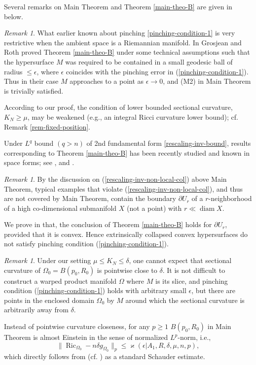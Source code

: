 \documentclass{amsart}
\numberwithin{equation}{section}
\theoremstyle{remark}
\newtheorem{rem}[theo]{Remark}
\renewcommand{\(}{\left(}
\renewcommand{\)}{\right)}
\renewcommand{\~}{\tilde}
\renewcommand{\-}{\overline}
\renewcommand{\d}{\delta}
\newcommand{\Ric}{\operatorname{Ric}}
\begin{document}
Several remarks on Main Theorem and Theorem \ref{main-theo-B} are given in below.
\begin{rem}
	What earlier known about pinching \eqref{pinching-condition-1} is very restrictive when the ambient space is a Riemannian manifold.
	In \cite{Grosjean-Roth2012} Grosjean and Roth proved Theorem \ref{main-theo-B} under some technical assumptions such that the hypersurface $M$ was required to be contained in a small geodesic ball of radius $\le \epsilon$, where $\epsilon$ coincides with the pinching error in (\ref{pinching-condition-1}). Thus in their case $M$ approaches to a point as $\epsilon\to 0$, and (M2) in Main Theorem is trivially satisfied.
	
	According to our proof, the condition of lower bounded sectional curvature, $K_N\ge \mu$, may be weakened (e.g., an integral Ricci curvature lower bound); cf. Remark \ref{rem-fixed-position}.
	
	Under $L^q$ bound $(q>n)$ of 2nd fundamental form \eqref{rescaling-inv-bound}, results corresponding to Theorem \ref{main-theo-B} has been recently studied and known in space forms; see \cite{Colbois-Grosjean2007}, \cite{Aubry-Grosjean} and \cite{Hu-Xu2017}. 
\end{rem}

\begin{rem}
	By the discussion on (\ref{rescaling-inv-non-local-col}) above Main Theorem, typical examples that violate (\ref{rescaling-inv-non-local-col}), and thus are not covered by Main Theorem, contain the boundary $\partial U_r$ of a $r$-neighborhood of a high co-dimensional submanifold $X$ (not a point) with $r \ll\operatorname{diam}X$.
	
	We prove in \cite{Hu-Xu2019} that, the conclusion of Theorem \ref{main-theo-B} holds for
	$\partial U_r$, provided that it is convex. Hence extrinsically collapsed convex hypersurfaces do not satisfy pinching condition (\ref{pinching-condition-1}).
\end{rem}


\begin{rem}\label{rem-curv}
	Under our setting $\mu\le K_N\le \d$, one cannot expect that sectional curvature of  $\Omega_0=B(p_0,R_0)$ is pointwise close to $\d$. It is not difficult to construct a warped product manifold $\Omega$ where $M$ is its slice, and pinching condition (\ref{pinching-condition-1}) holds with arbitrary small $\epsilon$, but there are points in the enclosed domain $\Omega_0$ by $M$ around which the sectional curvature is arbitrarily away from $\d$.
	
	Instead of pointwise curvature closeness, for any $p\ge 1$ $B(p_0,R_0)$ in Main Theorem is almost Einstein in the sense of normalized $L^{p}$-norm, i.e.,
	\begin{equation}
	\|\Ric_{\Omega_0}-n\delta g_{\Omega_0}\|_{p}\le \varkappa(\epsilon|A_1,R,\delta,\mu,n,p),
	\end{equation}
	which directly follows from \cite[Lemma 1.4]{Chen-Rong-Xu2018} (cf. \cite{Anderson1990}) as a standard Schauder estimate.
\end{rem}
\end{document}
